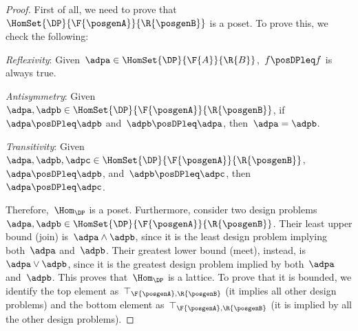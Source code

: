 \begin{proof}
  First of all, we need to prove that~$\HomSet{\DP}{\F{\posgenA}}{\R{\posgenB}}$ is a poset. To prove this, we check the following:

  \begin{compactitem}
    \item \emph{Reflexivity}: Given~$\adpa\in \HomSet{\DP}{\F{A}}{\R{B}}$,~$f\posDPleq f$ is always true.
    \item \emph{Antisymmetry}: Given~$\adpa,\adpb\in \HomSet{\DP}{\F{\posgenA}}{\R{\posgenB}}$, if~$\adpa\posDPleq \adpb$ and~$\adpb\posDPleq \adpa$, then~$\adpa=\adpb$.
    \item \emph{Transitivity}: Given~$\adpa,\adpb,\adpc\in \HomSet{\DP}{\F{\posgenA}}{\R{\posgenB}}$,~$\adpa\posDPleq \adpb$, and~$\adpb\posDPleq \adpc$, then~$\adpa\posDPleq \adpc$.
  \end{compactitem}
  Therefore,~$\Hom_\DP$ is a poset.
  Furthermore, consider two design problems~$\adpa,\adpb\in \HomSet{\DP}{\F{\posgenA}}{\R{\posgenB}}$.
  Their least upper bound (join) is~$\adpa\wedge \adpb$, since it is the least design problem implying both~$\adpa$ and~$\adpb$.
  Their greatest lower bound (meet), instead, is~$\adpa\vee \adpb$, since it is the greatest design problem implied by both~$\adpa$ and~$\adpb$.
  This proves that~$\Hom_\DP$ is a lattice.
  To prove that it is bounded, we identify the top element as~$\top_{\F{\posgenA},\R{\posgenB}}$ (it implies all other design problems) and the bottom element as~$\top_{\F{\posgenA},\R{\posgenB}}$ (it is implied by all the other design problems).
\end{proof}


